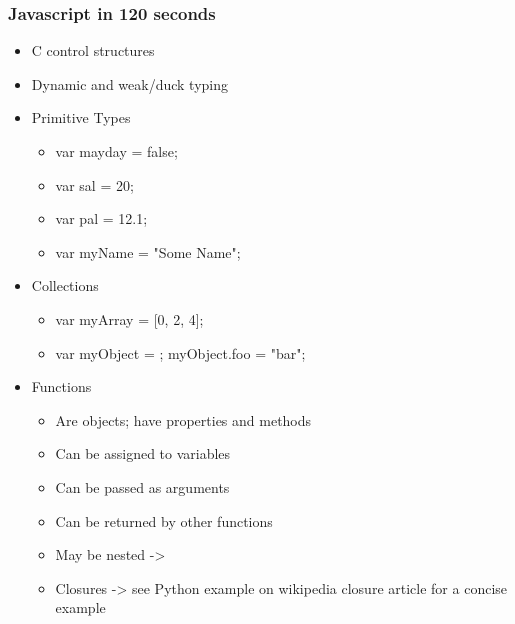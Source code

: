 \documentclass{beamer}
\begin{document}
\begin{frame}
    \frametitle{Javascript in 120 seconds}
    \begin{itemize}
    \item C control structures
    \item Dynamic and weak/duck typing
    \item Primitive Types
        \begin{itemize}
        \item var mayday = false;
        \item var sal = 20;
        \item var pal = 12.1;
        \item var myName = "Some Name";
        \end{itemize}
    \item Collections
        \begin{itemize}
        \item var myArray = [0, 2, 4];
        \item var myObject = {}; myObject.foo = "bar";
        \end{itemize}
    \item Functions
        \begin{itemize}
        \item Are objects; have properties and methods
        \item Can be assigned to variables
        \item Can be passed as arguments
        \item Can be returned by other functions
        \item May be nested -> 
        \item Closures -> see Python example on wikipedia closure article for a concise example
        \end{itemize}
    \end{itemize}
\end{frame}

\end{document}
